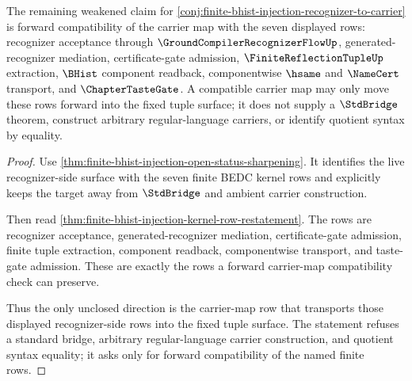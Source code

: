\begin{theorem}
\label{thm:finite-bhist-injection-carrier-map-forward-compatibility}
The remaining weakened claim for \autoref{conj:finite-bhist-injection-recognizer-to-carrier} is forward compatibility of the carrier map with the seven displayed rows: recognizer acceptance through $\GroundCompilerRecognizerFlowUp$, generated-recognizer mediation, certificate-gate admission, $\FiniteReflectionTupleUp$ extraction, $\BHist$ component readback, componentwise $\hsame$ and $\NameCert$ transport, and $\ChapterTasteGate$. A compatible carrier map may only move these rows forward into the fixed tuple surface; it does not supply a $\StdBridge$ theorem, construct arbitrary regular-language carriers, or identify quotient syntax by equality.
\end{theorem}
\begin{proof}
Use \autoref{thm:finite-bhist-injection-open-status-sharpening}. It identifies the live recognizer-side surface with the seven finite BEDC kernel rows and explicitly keeps the target away from $\StdBridge$ and ambient carrier construction.

Then read \autoref{thm:finite-bhist-injection-kernel-row-restatement}. The rows are recognizer acceptance, generated-recognizer mediation, certificate-gate admission, finite tuple extraction, component readback, componentwise transport, and taste-gate admission. These are exactly the rows a forward carrier-map compatibility check can preserve.

Thus the only unclosed direction is the carrier-map row that transports those displayed recognizer-side rows into the fixed tuple surface. The statement refuses a standard bridge, arbitrary regular-language carrier construction, and quotient syntax equality; it asks only for forward compatibility of the named finite rows.
\end{proof}

